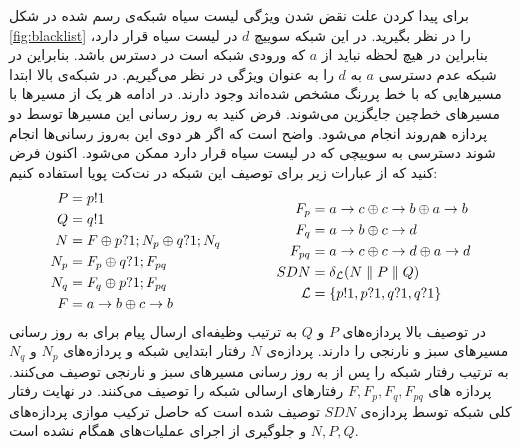برای پیدا کردن علت نقض شدن ویژگی لیست سیاه شبکه‌ی رسم شده در شکل
\ref{fig:blacklist}
را در نظر بگیرید.
در این شبکه سوییچ
$d$
در لیست‌ سیاه قرار دارد، بنابراین در هیچ لحظه نباید از
$a$
که ورودی شبکه است در دسترس باشد.
بنابراین در شبکه عدم دسترسی 
$a$
به 
$d$
را به عنوان ویژگی در نظر می‌گیریم.
در شبکه‌ی بالا ابتدا مسیر‌هایی که با خط پررنگ مشخص شده‌اند وجود دارند.
در ادامه هر یک از مسیرها با مسیر‌های خط‌چین جایگزین می‌شوند.
فرض کنید به روز رسانی این مسیر‌ها توسط دو پردازه هم‌روند انجام می‌شود.
واضح است که اگر هر دوی این به‌روز رسانی‌ها انجام شوند دسترسی به سوییچی که در لیست سیاه قرار دارد ممکن می‌شود.
اکنون فرض کنید که از عبارات زیر برای توصیف این شبکه در نت‌کت پویا استفاده کنیم:
\begin{equation*}
    \begin{aligned}[c]
        P   & = p!1                             \\
        Q   & = q!1                             \\
        N   & = F \oplus p?1;N_p \oplus q?1;N_q \\
        N_p & = F_p \oplus q?1;F_{pq}           \\
        N_q & = F_q \oplus p?1;F_{pq}           \\
        F   & = a\rightarrow b \oplus c\rightarrow b            \\
    \end{aligned}
    \qquad\qquad
    \begin{aligned}[c]
        F_p         & = a\rightarrow c \oplus c\rightarrow b \oplus a\rightarrow b \\
        F_q         & = a\rightarrow b \oplus c\rightarrow d               \\
        F_{pq}      & = a\rightarrow c \oplus c\rightarrow d \oplus a\rightarrow d \\
        SDN         & = \delta_{\mathcal{L}} (N
        \parallel P \parallel Q)                           \\
        \mathcal{L} & = \{p!1,p?1,q?1,q?1\}                \\
    \end{aligned}
\end{equation*}
در توصیف بالا پردازه‌های
$P$
و
$Q$
به ترتیب وظیفه‌ای ارسال پیام برای به روز رسانی مسیر‌های سبز و نارنجی را دارند.
پردازه‌ی
$N$
رفتار ابتدایی شبکه و پردازه‌های
$N_p$
و
$N_q$
به ترتیب رفتار شبکه را پس از به روز رسانی مسیر‌های سبز و نارنجی توصیف می‌کنند.
پردازه‌ های
$F,F_p,F_q,F_{pq}$
رفتارهای ارسالی
شبکه را توصیف می‌کنند.
در نهایت رفتار کلی شبکه توسط پردازه‌ی
$SDN$
توصیف شده است که حاصل ترکیب موازی پردازه‌های
$N,P,Q$
و جلوگیری از اجرای عملیات‌های همگام نشده است.
